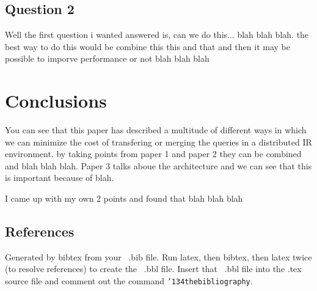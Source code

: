 \documentclass{acm_proc_article-sp}
\begin{document}
\subsection{Question 2}
Well the first question i wanted answered is, can we do this... blah blah blah. the best way to do this would be combine this this and that and then it may be possible to imporve performance or not blah blah blah

\section{Conclusions}
You can see that this paper has described a multitude of different ways in which we can minimize the cost of transfering or merging the queries in a distributed IR environment. by taking points from paper 1 and paper 2 they can be combined and blah blah blah. Paper 3 talks aboue the architecture and we can see that this is important because of blah.

I came up with my own 2 points and found that blah blah blah


 

\subsection{References}
Generated by bibtex from your ~.bib file.  Run latex,
then bibtex, then latex twice (to resolve references)
to create the ~.bbl file.  Insert that ~.bbl file into
the .tex source file and comment out
the command \texttt{{\char'134}thebibliography}.
\balancecolumns
\end{document}
